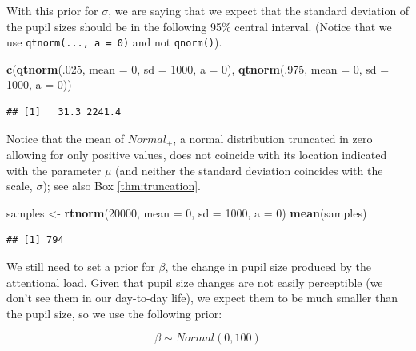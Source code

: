 \documentclass[12pt,]{krantz}
\newenvironment{Shaded}{\begin{snugshade}}{\end{snugshade}}
\newcommand{\DataTypeTok}[1]{\textcolor[rgb]{0.13,0.29,0.53}{#1}}
\newcommand{\DecValTok}[1]{\textcolor[rgb]{0.00,0.00,0.81}{#1}}
\newcommand{\KeywordTok}[1]{\textcolor[rgb]{0.13,0.29,0.53}{\textbf{#1}}}
\newcommand{\NormalTok}[1]{#1}
\newcommand{\StringTok}[1]{\textcolor[rgb]{0.31,0.60,0.02}{#1}}
\theoremstyle{definition}
\theoremstyle{definition}
\theoremstyle{definition}
\theoremstyle{remark}
\begin{document}
With this prior for \(\sigma\), we are saying that we expect that the standard deviation of the pupil sizes should be in the following 95\% central interval. (Notice that we use \texttt{qtnorm(...,\ a\ =\ 0)} and not \texttt{qnorm()}).

\begin{Shaded}
\begin{Highlighting}[]
\KeywordTok{c}\NormalTok{(}\KeywordTok{qtnorm}\NormalTok{(.}\DecValTok{025}\NormalTok{, }\DataTypeTok{mean =} \DecValTok{0}\NormalTok{, }\DataTypeTok{sd =} \DecValTok{1000}\NormalTok{, }\DataTypeTok{a =} \DecValTok{0}\NormalTok{),}
  \KeywordTok{qtnorm}\NormalTok{(.}\DecValTok{975}\NormalTok{, }\DataTypeTok{mean =} \DecValTok{0}\NormalTok{, }\DataTypeTok{sd =} \DecValTok{1000}\NormalTok{, }\DataTypeTok{a =} \DecValTok{0}\NormalTok{))}
\end{Highlighting}
\end{Shaded}

\begin{verbatim}
## [1]   31.3 2241.4
\end{verbatim}

Notice that the mean of \(Normal_+\), a normal distribution truncated in zero allowing for only positive values, does not coincide with its location indicated with the parameter \(\mu\) (and neither the standard deviation coincides with the scale, \(\sigma\)); see also Box \ref{thm:truncation}.

\begin{Shaded}
\begin{Highlighting}[]
\NormalTok{samples <-}\StringTok{ }\KeywordTok{rtnorm}\NormalTok{(}\DecValTok{20000}\NormalTok{, }\DataTypeTok{mean =} \DecValTok{0}\NormalTok{, }\DataTypeTok{sd =} \DecValTok{1000}\NormalTok{, }\DataTypeTok{a =} \DecValTok{0}\NormalTok{)}
\KeywordTok{mean}\NormalTok{(samples)}
\end{Highlighting}
\end{Shaded}

\begin{verbatim}
## [1] 794
\end{verbatim}

We still need to set a prior for \(\beta\), the change in pupil size produced by the attentional load. Given that pupil size changes are not easily perceptible (we don't see them in our day-to-day life), we expect them to be much smaller than the pupil size, so we use the following prior:

\begin{equation}
\beta \sim Normal(0, 100)
\end{equation}
\end{document}
